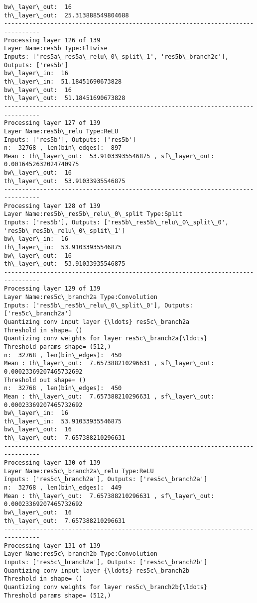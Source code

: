 \documentclass[11pt]{article}
\begin{document}
\begin{Verbatim}[commandchars=\\\{\}]
bw\_layer\_out:  16
th\_layer\_out:  25.313888549804688
--------------------------------------------------------------------------------
Processing layer 126 of 139
Layer Name:res5b Type:Eltwise
Inputs: ['res5a\_res5a\_relu\_0\_split\_1', 'res5b\_branch2c'], Outputs: ['res5b']
bw\_layer\_in:  16
th\_layer\_in:  51.18451690673828
bw\_layer\_out:  16
th\_layer\_out:  51.18451690673828
--------------------------------------------------------------------------------
Processing layer 127 of 139
Layer Name:res5b\_relu Type:ReLU
Inputs: ['res5b'], Outputs: ['res5b']
n:  32768 , len(bin\_edges):  897
Mean : th\_layer\_out:  53.91033935546875 , sf\_layer\_out:  0.0016452632024740975
bw\_layer\_out:  16
th\_layer\_out:  53.91033935546875
--------------------------------------------------------------------------------
Processing layer 128 of 139
Layer Name:res5b\_res5b\_relu\_0\_split Type:Split
Inputs: ['res5b'], Outputs: ['res5b\_res5b\_relu\_0\_split\_0', 'res5b\_res5b\_relu\_0\_split\_1']
bw\_layer\_in:  16
th\_layer\_in:  53.91033935546875
bw\_layer\_out:  16
th\_layer\_out:  53.91033935546875
--------------------------------------------------------------------------------
Processing layer 129 of 139
Layer Name:res5c\_branch2a Type:Convolution
Inputs: ['res5b\_res5b\_relu\_0\_split\_0'], Outputs: ['res5c\_branch2a']
Quantizing conv input layer {\ldots} res5c\_branch2a
Threshold in shape= ()
Quantizing conv weights for layer res5c\_branch2a{\ldots}
Threshold params shape= (512,)
n:  32768 , len(bin\_edges):  450
Mean : th\_layer\_out:  7.657388210296631 , sf\_layer\_out:  0.00023369207465732692
Threshold out shape= ()
n:  32768 , len(bin\_edges):  450
Mean : th\_layer\_out:  7.657388210296631 , sf\_layer\_out:  0.00023369207465732692
bw\_layer\_in:  16
th\_layer\_in:  53.91033935546875
bw\_layer\_out:  16
th\_layer\_out:  7.657388210296631
--------------------------------------------------------------------------------
Processing layer 130 of 139
Layer Name:res5c\_branch2a\_relu Type:ReLU
Inputs: ['res5c\_branch2a'], Outputs: ['res5c\_branch2a']
n:  32768 , len(bin\_edges):  449
Mean : th\_layer\_out:  7.657388210296631 , sf\_layer\_out:  0.00023369207465732692
bw\_layer\_out:  16
th\_layer\_out:  7.657388210296631
--------------------------------------------------------------------------------
Processing layer 131 of 139
Layer Name:res5c\_branch2b Type:Convolution
Inputs: ['res5c\_branch2a'], Outputs: ['res5c\_branch2b']
Quantizing conv input layer {\ldots} res5c\_branch2b
Threshold in shape= ()
Quantizing conv weights for layer res5c\_branch2b{\ldots}
Threshold params shape= (512,)

\end{Verbatim}
\end{document}
